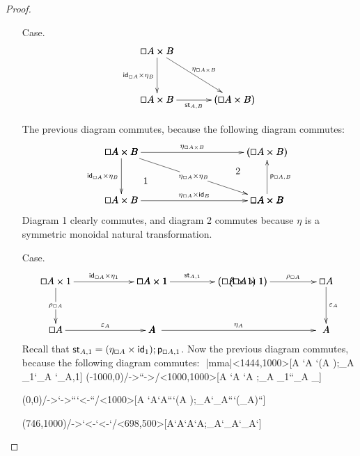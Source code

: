 \documentclass{article}
\let\Diamond\relax
\renewcommand{\Box}{\oblong}
\newcommand{\pd}[0]{\times}
\newcommand{\st}[2]{\mathsf{st}_{#1,#2}}
\newcommand{\id}[0]{\mathsf{id}}
\newcommand{\p}[1]{\mathsf{p}_{#1}}
\begin{document}
\begin{proof}
\begin{itemize}
  \item[Case.] \ \\
    $$
    \bfig
    \btriangle<800,500>[
      \Box A \pd B`
      \Box A \pd \Diamond B`
      \Diamond(\Box A \pd B);
      \id_{\Box A} \pd \eta_{B}`
      \eta_{\Box A \times B}`
      \st{A}{B}]
    \efig
    $$

    The previous diagram commutes, because the following diagram commutes:
    $$
    \bfig
    \btriangle|ama|/->`->`->/<1500,500>[
      \Box A \pd B`
      \Box A \pd \Diamond B`
      \Diamond\Box A \pd \Diamond B;
      \id_{\Box A} \pd \eta_{B}`
      \eta_{\Box A} \pd \eta_B`
      \eta_{\Box A} \pd \id_{\Diamond B}]

    \qtriangle(0,0)/->``<-/<1500,500>[
      \Box A \pd B`
      \Diamond (\Box A \times B)`
      \Diamond\Box A \pd \Diamond B;
      \eta_{\Box A \times B}``
      \p{\Box A,B}]

    \place(250,200)[1]
    \place(1200,300)[2]
    \efig
    $$
    \noindent
    Diagram 1 clearly commutes, and diagram 2 commutes because $\eta$
    is a symmetric monoidal natural transformation.
    
  \item[Case.]\ \\
    $$
    \bfig
    \hSquares|aamaaaa|/->`->`->```->`/[
      \Box A \times 1`
      \Box A \times \Diamond 1`
      \Diamond (\Box A \times 1)`
      \Box A`
      A`
      ;
      \id_{\Box A} \times \eta_1`
      \st{A}{1}`
      \rho_{\Box A}```
      \varepsilon_A`]
    \qtriangle(1978,0)/->``->/<800,500>[\Diamond (\Box A \times 1)`\Diamond\Box A`\Diamond A;\Diamond \rho_{\Box A}``\Diamond\varepsilon_A]
    \morphism(1060,0)/->/<1640,0>[`;\eta_A]
    \efig
    $$
    \noindent
    Recall that
    $\st{A}{1} = (\eta_{\Box A} \pd \id_{\Diamond 1});\p{\Box A,1}$.
    Now the previous diagram commutes, because the following diagram commutes:
    $$
    \bfig
    \btriangle|mma|<1444,1000>[\Box A \pd 1`\Diamond\Box A \pd \Diamond 1`\Diamond(\Box A \pd 1);\eta_{\Box A} \pd \eta_1`\eta_{\Box A \pd 1}`\p{\Box A,1}]
    \dtriangle(-1000,0)/->``->/<1000,1000>[\Box A \pd 1`\Box A \pd 1`\Diamond\Box A \pd \Diamond 1;\id_{\Box A} \pd \eta_1``\eta_{\Box A} \pd
      \id_{\Diamond 1}]

    \hSquares(0,0)/->`->```<-``/<1000>[\Box A \pd 1`\Box A`\Diamond\Box A```\Diamond (\Box A );\rho_{\Box A}`\eta_{\Box A}```\Diamond (\rho_{\Box A})``]

    \square(746,1000)/->`<-`<-`/<698,500>[A`\Diamond A`\Box A`\Diamond\Box A;\eta_A`\varepsilon_A`\Diamond\varepsilon_A`]


\end{itemize}
\end{proof}
\end{document}
